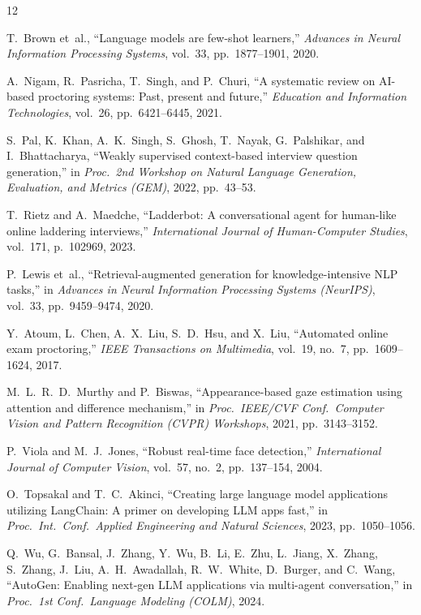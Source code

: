 \documentclass[conference]{IEEEtran}
\begin{document}
\begin{thebibliography}{12}

T.~Brown et~al.,
``Language models are few-shot learners,''
\emph{Advances in Neural Information Processing Systems},
vol.~33, pp.~1877--1901, 2020.

A.~Nigam, R.~Pasricha, T.~Singh, and P.~Churi,
``A systematic review on AI-based proctoring systems: Past, present
and future,''
\emph{Education and Information Technologies},
vol.~26, pp.~6421--6445, 2021.

S.~Pal, K.~Khan, A.~K.~Singh, S.~Ghosh, T.~Nayak, G.~Palshikar,
and I.~Bhattacharya,
``Weakly supervised context-based interview question generation,''
in \emph{Proc.\ 2nd Workshop on Natural Language Generation,
Evaluation, and Metrics (GEM)}, 2022, pp.~43--53.

T.~Rietz and A.~Maedche,
``Ladderbot: A conversational agent for human-like online laddering
interviews,''
\emph{International Journal of Human-Computer Studies},
vol.~171, p.~102969, 2023.

P.~Lewis et~al.,
``Retrieval-augmented generation for knowledge-intensive NLP tasks,''
in \emph{Advances in Neural Information Processing Systems (NeurIPS)},
vol.~33, pp.~9459--9474, 2020.

Y.~Atoum, L.~Chen, A.~X.~Liu, S.~D.~Hsu, and X.~Liu,
``Automated online exam proctoring,''
\emph{IEEE Transactions on Multimedia},
vol.~19, no.~7, pp.~1609--1624, 2017.

M.~L.~R.~D.~Murthy and P.~Biswas,
``Appearance-based gaze estimation using attention and difference
mechanism,''
in \emph{Proc.\ IEEE/CVF Conf.\ Computer Vision and Pattern
Recognition (CVPR) Workshops}, 2021, pp.~3143--3152.

P.~Viola and M.~J.~Jones,
``Robust real-time face detection,''
\emph{International Journal of Computer Vision},
vol.~57, no.~2, pp.~137--154, 2004.

O.~Topsakal and T.~C.~Akinci,
``Creating large language model applications utilizing LangChain:
A primer on developing LLM apps fast,''
in \emph{Proc.\  Int.\ Conf.\ Applied Engineering and Natural Sciences},
2023, pp.~1050--1056.

Q.~Wu, G.~Bansal, J.~Zhang, Y.~Wu, B.~Li, E.~Zhu, L.~Jiang,
X.~Zhang, S.~Zhang, J.~Liu, A.~H.~Awadallah, R.~W.~White, D.~Burger,
and C.~Wang,
``AutoGen: Enabling next-gen LLM applications via multi-agent
conversation,''
in \emph{Proc.\ 1st Conf.\ Language Modeling (COLM)}, 2024.


\end{thebibliography}
\end{document}
